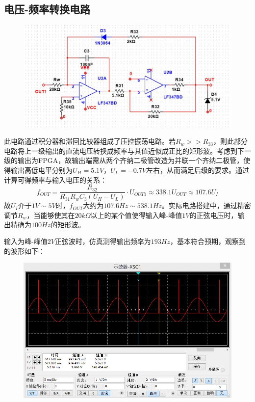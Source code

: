 \documentclass[12pt,a4paper]{article}
\begin{document}
\begin{spacing}{1.3}
\subsection{电压-频率转换电路}
\begin{figure}[H]
\centering
\includegraphics[width=\textwidth]{2.jpg}
\end{figure}
此电路通过积分器和滞回比较器组成了压控振荡电路。若$R_w>>R_{33}$，则此部分电路将上一级输出的直流电压转换成频率与其值近似成正比的矩形波。考虑到下一级的输出为FPGA，故输出端需从两个齐纳二极管改造为并联一个齐纳二极管，使得输出高低电平分别为$U_H=5.1V$，$U_L=-0.7V$左右，从而满足后级的要求。通过计算可得频率与输入电压的关系：
\[
f_{OUT} = \frac{R_{32}}{R_{31} R_w C_3(U_H-U_L)} \cdot U_{OUT1} \approx 338.1 U_{OUT} \approx 107.6 U_I
\]
故$U_I$介于$1V\sim 5V$时，$f_{OUT}$大约为$107.6Hz\sim 538.1Hz$。实际电路搭建中，通过精密调节$R_w$，当能够使其在$20k\Omega$以上的某个值使得输入峰-峰值$1V$的正弦电压时，输出精确为$100Hz$的矩形波。\par 
输入为峰-峰值$2V$正弦波时，仿真测得输出频率为$193Hz$，基本符合预期，观察到的波形如下：
\begin{figure}[H]
\centering
\includegraphics[width=\textwidth]{4.jpg}
\end{figure}

\end{spacing}
\end{document}
